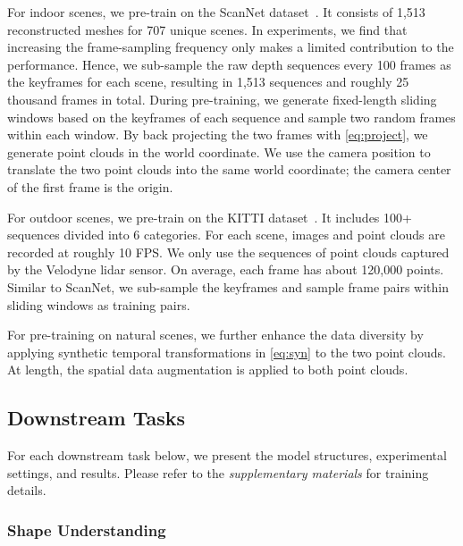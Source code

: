 \documentclass[10pt,twocolumn,letterpaper]{article}
\makeatletter
\renewcommand{\paragraph}{\@startsection{paragraph}{4}{\z@}{0ex \@plus 0ex \@minus 0ex}{-1em}{\hskip\parindent\normalfont\normalsize\bfseries}}
\makeatother
\begin{document}
\paragraph{ScanNet}

For indoor scenes, we pre-train on the ScanNet dataset~\cite{dai2017scannet}. It consists of 1,513 reconstructed meshes for 707 unique scenes. In experiments, we find that increasing the frame-sampling frequency only makes a limited contribution to the performance. Hence, we sub-sample the raw depth sequences every 100 frames as the keyframes for each scene, resulting in 1,513 sequences and roughly 25 thousand frames in total. During pre-training, we generate fixed-length sliding windows based on the keyframes of each sequence and sample two random frames within each window. By back projecting the two frames with \cref{eq:project}, we generate point clouds in the world coordinate. We use the camera position to translate the two point clouds into the same world coordinate; the camera center of the first frame is the origin. 

\paragraph{KITTI}

For outdoor scenes, we pre-train on the KITTI dataset~\cite{geiger2013vision}. It includes 100+ sequences divided into 6 categories. For each scene, images and point clouds are recorded at roughly 10 FPS. We only use the sequences of point clouds captured by the Velodyne lidar sensor. On average, each frame has about 120,000 points. Similar to ScanNet, we sub-sample the keyframes and sample frame pairs within sliding windows as training pairs. 

For pre-training on natural scenes, we further enhance the data diversity by applying synthetic temporal transformations in \cref{eq:syn} to the two point clouds. At length, the spatial data augmentation is applied to both point clouds.

\subsection{Downstream Tasks}\label{sec:downstream}

For each downstream task below, we present the model structures, experimental settings, and results. Please refer to the \emph{supplementary materials} for training details.

\subsubsection{Shape Understanding}\label{sec:shape_cls}
\end{document}
